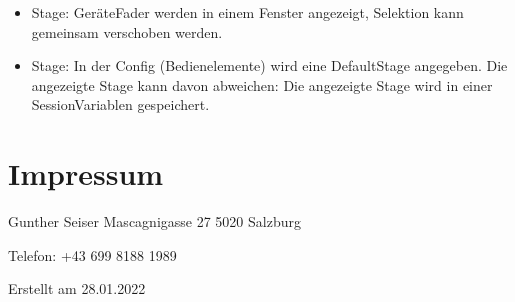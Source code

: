 \documentclass[letterpaper,10pt,ngerman]{sphinxmanual}
\begin{document}
\begin{itemize}
\begin{itemize}
\item {} 
Stage: Geräte\sphinxhyphen{}Fader werden in einem Fenster angezeigt, Selektion kann gemeinsam
verschoben werden.

\item {} 
Stage: In der Config (Bedienelemente) wird eine Default\sphinxhyphen{}Stage angegeben. Die
angezeigte Stage kann davon abweichen: Die angezeigte Stage wird in einer
Session\sphinxhyphen{}Variablen gespeichert.

\end{itemize}

\end{itemize}


\chapter{Impressum}
\label{\detokenize{impressum:impressum}}\label{\detokenize{impressum::doc}}
Gunther Seiser
Mascagnigasse 27
5020 Salzburg

Telefon: +43 699 8188 1989


Erstellt  am 28.01.2022



\renewcommand{\indexname}{Stichwortverzeichnis}
\printindex
\end{document}
